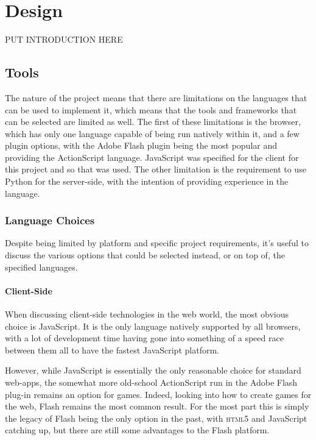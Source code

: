 \chapter{Design}\label{chap:design}

PUT INTRODUCTION HERE

\section{Tools}
The nature of the project means that there are limitations on the languages that can be used to implement it, which means that the tools and frameworks that can be selected are limited as well. The first of these limitations is the browser, which has only one language capable of being run natively within it, and a few plugin options, with the Adobe Flash plugin being the most popular and providing the ActionScript language. JavaScript was specified for the client for this project and so that was used. The other limitation is the requirement to use Python for the server-side, with the intention of providing experience in the language.

\subsection{Language Choices}
Despite being limited by platform and specific project requirements, it's useful to discuss the various options that could be selected instead, or on top of, the specified languages.

\subsubsection{Client-Side}
When discussing client-side technologies in the web world, the most obvious choice is JavaScript. It is the only language natively supported by all browsers, with a lot of development time having gone into something of a speed race between them all to have the fastest JavaScript platform.

However, while JavaScript is essentially the only reasonable choice for standard web-apps, the somewhat more old-school ActionScript run in the Adobe Flash plug-in remains an option for games. Indeed, looking into how to create games for the web, Flash remains the most common result. For the most part this is simply the legacy of Flash being the only option in the past, with \textsc{html5} and JavaScript catching up, but there are still some advantages to the Flash platform.

